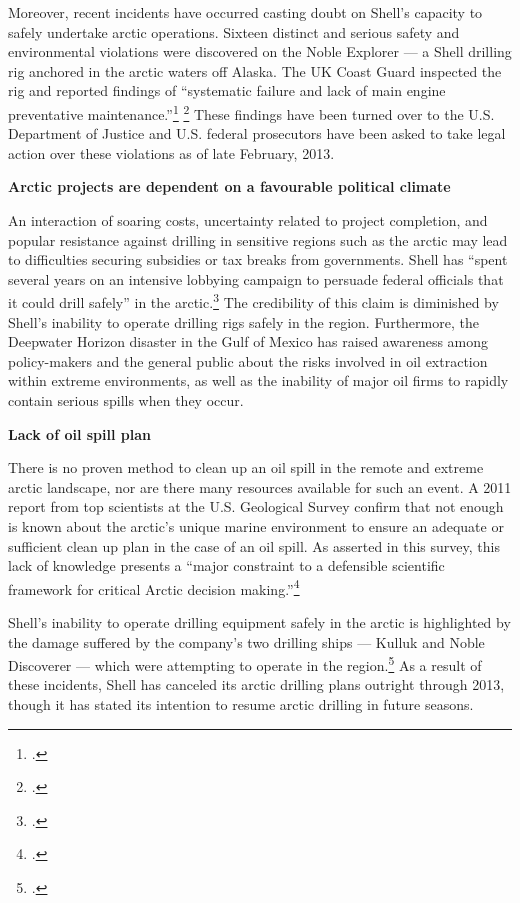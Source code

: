 Moreover, recent incidents have occurred casting doubt on Shell's capacity to safely undertake arctic operations. 
Sixteen distinct and serious safety and environmental violations were discovered on the Noble Explorer --- a Shell drilling rig anchored in the arctic waters off Alaska. 
The UK Coast Guard inspected the rig and reported findings of ``systematic failure and lack of main engine preventative maintenance.''\footcite{RigFindings} \footcite[See also: ][]{ArcticUnsafe}
These findings have been turned over to the U.S. Department of Justice and U.S. federal prosecutors have been asked to take legal action over these violations as of late February, 2013. 



\textbf{Arctic projects are dependent on a favourable political climate}



An interaction of soaring costs, uncertainty related to project completion, and popular resistance against drilling in sensitive regions such as the arctic may lead to difficulties securing subsidies or tax breaks from governments.
Shell has ``spent several years on an intensive lobbying campaign to persuade federal officials that it could drill safely'' in the arctic.\footcite{ShellSuspends}
The credibility of this claim is diminished by Shell's inability to operate drilling rigs safely in the region.
Furthermore, the Deepwater Horizon disaster in the Gulf of Mexico has raised awareness among policy-makers and the general public about the risks involved in oil extraction within extreme environments, as well as the inability of major oil firms to rapidly contain serious spills when they occur.



\textbf{Lack of oil spill plan}



There is no proven method to clean up an oil spill in the remote and extreme arctic landscape, nor are there many resources available for such an event. 
A 2011 report from top scientists at the U.S. Geological Survey confirm that not enough is known about the arctic's unique marine environment to ensure an adequate or sufficient clean up plan in the case of an oil spill. 
As asserted in this survey, this lack of knowledge presents a ``major constraint to a defensible scientific framework for critical Arctic decision making.''\footcite[][]{Holland-BartelsPierce_2011}



Shell's inability to operate drilling equipment safely in the arctic is highlighted by the damage suffered by the company's two drilling ships --- Kulluk and Noble Discoverer --- which were attempting to operate in the region.\footcite{ShellSuspends}
As a result of these incidents, Shell has canceled its arctic drilling plans outright through 2013, though it has stated its intention to resume arctic drilling in future seasons.



